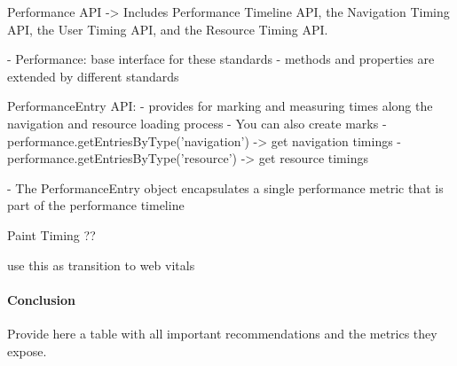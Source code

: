 Performance API 
-> Includes Performance Timeline API, the Navigation Timing API, the User Timing API, and the Resource Timing API.


- Performance: base interface for these standards
- methods and properties are extended by different standards


PerformanceEntry API:
- provides for marking and measuring times along the navigation and resource loading process
- You can also create marks
- performance.getEntriesByType('navigation') -> get navigation timings
- performance.getEntriesByType('resource') -> get resource timings


- The PerformanceEntry object encapsulates a single performance metric that is part of the performance timeline






Paint Timing ??




use this as transition to web vitals








\paragraph{Conclusion}


Provide here a table with all important recommendations and the metrics they expose.










